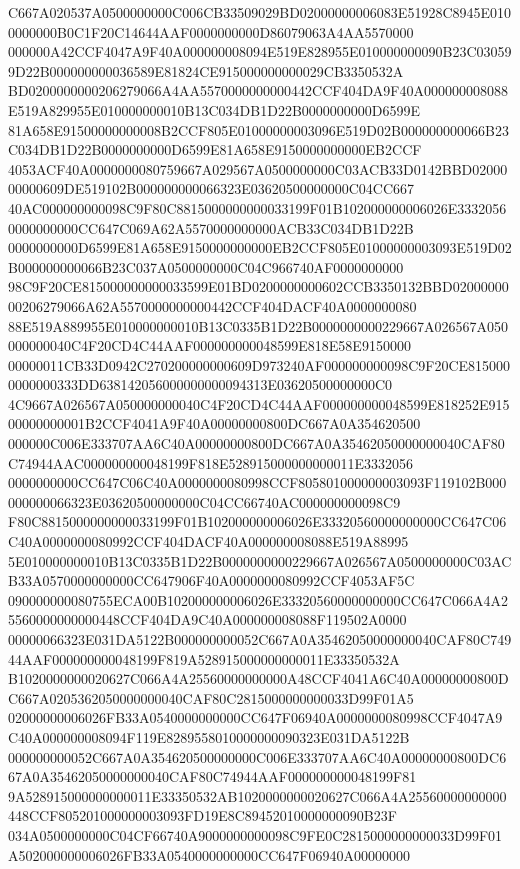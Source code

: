 \documentclass[UTF8,fontset=fandol,zihao=-4,a4paper]{ctexart}
\begin{document}
{{C667A020537A0500000000C006CB33509029BD02000000006083E51928C8945E0100000000B0C1F20C14644AAF0000000000D86079063A4AA5570000
000000A42CCF4047A9F40A000000008094E519E828955E010000000090B23C030599D22B000000000036589E81824CE915000000000029CB3350532A
BD0200000000206279066A4AA5570000000000442CCF404DA9F40A000000008088E519A829955E010000000010B13C034DB1D22B0000000000D6599E
81A658E91500000000008B2CCF805E01000000003096E519D02B000000000066B23C034DB1D22B0000000000D6599E81A658E9150000000000EB2CCF
4053ACF40A0000000080759667A029567A0500000000C03ACB33D0142BBD0200000000609DE519102B000000000066323E03620500000000C04CC667
40AC000000000098C9F80C8815000000000033199F01B102000000006026E33320560000000000CC647C069A62A5570000000000ACB33C034DB1D22B
0000000000D6599E81A658E9150000000000EB2CCF805E01000000003093E519D02B000000000066B23C037A0500000000C04C966740AF0000000000
98C9F20CE815000000000033599E01BD0200000000602CCB3350132BBD0200000000206279066A62A5570000000000442CCF404DACF40A0000000080
88E519A889955E010000000010B13C0335B1D22B0000000000229667A026567A050000000040C4F20CD4C44AAF000000000048599E818E58E9150000
00000011CB33D0942C270200000000609D973240AF000000000098C9F20CE8150000000000333DD638142056000000000094313E03620500000000C0
4C9667A026567A050000000040C4F20CD4C44AAF000000000048599E818252E91500000000001B2CCF4041A9F40A00000000800DC667A0A354620500
000000C006E333707AA6C40A00000000800DC667A0A35462050000000040CAF80C74944AAC000000000048199F818E528915000000000011E3332056
0000000000CC647C06C40A0000000080998CCF805801000000003093F119102B000000000066323E03620500000000C04CC66740AC000000000098C9
F80C8815000000000033199F01B102000000006026E33320560000000000CC647C06C40A0000000080992CCF404DACF40A000000008088E519A88995
5E010000000010B13C0335B1D22B0000000000229667A026567A0500000000C03ACB33A0570000000000CC647906F40A0000000080992CCF4053AF5C
090000000080755ECA00B102000000006026E33320560000000000CC647C066A4A25560000000000448CCF404DA9C40A000000008088F119502A0000
00000066323E031DA5122B000000000052C667A0A35462050000000040CAF80C74944AAF000000000048199F819A528915000000000011E33350532A
B1020000000020627C066A4A25560000000000A48CCF4041A6C40A00000000800DC667A0205362050000000040CAF80C2815000000000033D99F01A5
02000000006026FB33A0540000000000CC647F06940A0000000080998CCF4047A9C40A000000008094F119E8289558010000000090323E031DA5122B
000000000052C667A0A354620500000000C006E333707AA6C40A00000000800DC667A0A35462050000000040CAF80C74944AAF000000000048199F81
9A528915000000000011E33350532AB1020000000020627C066A4A25560000000000448CCF805201000000003093FD19E8C89452010000000090B23F
034A0500000000C04CF66740A9000000000098C9FE0C2815000000000033D99F01A502000000006026FB33A0540000000000CC647F06940A00000000
}}
\end{document}
